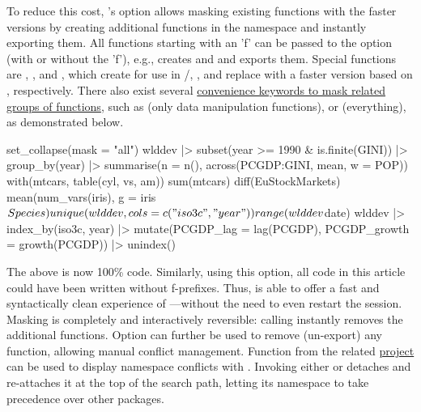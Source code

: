 \documentclass[article]{jss} %
\newcommand{\fct}[1]{\code{#1()}}
\begin{document}
To reduce this cost, 's  option allows masking existing  functions with the faster  versions by creating additional functions in the namespace and instantly exporting them. All  functions starting with an 'f' can be passed to the option (with or without the 'f'), e.g.,  creates  and  and exports them. Special functions are , , and , which create  for use in /, , and replace  with a faster version based on \fct{fmatch}, respectively. There also exist several \href{https://sebkrantz.github.io/collapse/reference/collapse-options.html}{convenience keywords to mask related groups of functions}, such as  (only data manipulation functions), or  (everything), as demonstrated below.
%
\begin{Code}
set_collapse(mask = "all")
wlddev |> subset(year >= 1990 & is.finite(GINI)) |>
  group_by(year) |>
  summarise(n = n(), across(PCGDP:GINI, mean, w = POP))
with(mtcars, table(cyl, vs, am))
sum(mtcars)
diff(EuStockMarkets)
mean(num_vars(iris), g = iris$Species)
unique(wlddev, cols = c("iso3c", "year"))
range(wlddev$date)
wlddev |> index_by(iso3c, year) |>
  mutate(PCGDP_lag = lag(PCGDP),
         PCGDP_growth = growth(PCGDP)) |> unindex()
\end{Code}
%
The above is now 100\%  code. Similarly, using this option, all code in this article could have been written without f-prefixes. Thus,  is able to offer a fast and syntactically clean experience of ---without the need to even restart the session. Masking is completely and interactively reversible: calling  instantly removes the additional functions. Option  can further be used to remove (un-export) any  function, allowing manual conflict management. Function  from the related \href{https://fastverse.github.io/fastverse/}{ project} \citep{rfastverse} can be used to display namespace conflicts with . Invoking either  or  detaches  and re-attaches it at the top of the search path, letting its namespace to take precedence over other packages. \newline
\end{document}
